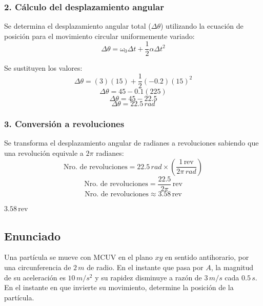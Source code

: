 \documentclass[12pt, a4paper]{article}
\begin{document}
\subsubsection*{2. Cálculo del desplazamiento angular}
Se determina el desplazamiento angular total ($\Delta \theta$) utilizando la ecuación de posición para el movimiento circular uniformemente variado:
$$ \Delta \theta = \omega_0 \Delta t + \frac{1}{2} \alpha \Delta t^2 $$

Se sustituyen los valores:
$$ \Delta \theta = (3)(15) + \frac{1}{2}(-0.2)(15)^2 $$
$$ \Delta \theta = 45 - 0.1(225) $$
$$ \Delta \theta = 45 - 22.5 $$
$$ \Delta \theta = 22.5 \, \si{rad} $$

\subsubsection*{3. Conversión a revoluciones}
Se transforma el desplazamiento angular de radianes a revoluciones sabiendo que una revolución equivale a $2\pi$ radianes:
$$ \text{Nro. de revoluciones} = 22.5 \, \si{rad} \times \left( \frac{1 \, \text{rev}}{2\pi \, \si{rad}} \right) $$
$$ \text{Nro. de revoluciones} = \frac{22.5}{2\pi} \, \text{rev} $$
$$ \text{Nro. de revoluciones} \approx 3.58 \, \text{rev} $$

\begin{tcolorbox}[colback=green!5!white, colframe=green!50!black, title=Respuesta Final]
\centering \Large $3.58 \, \text{rev}$
\end{tcolorbox}

\newpage

\subsection*{Enunciado}
Una partícula se mueve con MCUV en el plano $xy$ en sentido antihorario, por una circunferencia de $2 \, \si{m}$ de radio. En el instante que pasa por $A$, la magnitud de su aceleración es $10 \, \si{m/s^2}$ y su rapidez disminuye a razón de $3 \, \si{m/s}$ cada $0.5 \, \si{s}$. En el instante en que invierte su movimiento, determine la posición de la partícula.

\begin{center}
\end{center}
\end{document}
